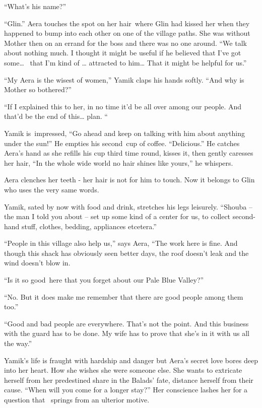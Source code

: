 \documentclass[12pt]{book}
\begin{document}
{}``What's his name?''

{}``Glin.'' Aera touches the spot on her hair~where Glin had kissed her when they happened to bump into each other on
one of the village paths. She was without Mother then on an errand for the boss and there was no one around. ``We talk
about nothing much. I thought it might be useful if he believed that I've got some{\dots} \ that I'm kind of {\dots}
attracted to him{\dots} That it might be helpful for us.''

{}``My Aera is the wisest of women,'' Yamik claps his hands softly. ``And why is Mother so bothered?''

{}``If I explained this to her, in no time it'd be all over among our people. And that'd be the end of this{\dots} plan.
``

Yamik is~impressed, ``Go ahead and keep on talking with him about anything under the sun!'' He empties his second~cup of
coffee. ``Delicious.'' He catches Aera's hand as she refills his cup third time round, kisses it, then gently caresses
her hair, ``In the whole wide world no hair shines like yours,'' he whispers.

Aera clenches her teeth - her hair is not for him to touch. Now it belongs to Glin who uses the very same words.~

Yamik, sated by now with food and drink, stretches his legs leisurely. ``Shouba -- the man I told you about -- set up
some kind of a center for us, to collect second-hand stuff, clothes, bedding, appliances etcetera.''

{}``People in this village also help us,'' says Aera, ``The work here is fine. And though this shack has obviously seen
better days, the roof doesn't leak and the wind doesn't blow in.{\textquotedbl}

{}``Is it so good~here that you forget about our Pale Blue Valley?''

{}``No. But it does make me remember that there are good people among them too.''

{}``Good and bad people are everywhere. That's not the point. And this business with the guard has to be done. My wife
has to prove that she's in it with us all the way.''

Yamik's life is fraught with hardship and danger but Aera's secret love bores deep into her heart. How she wishes she
were someone else. She wants to extricate herself from her predestined share in the Balads' fate, distance herself from
their cause. ``When will you come for a longer stay?'' Her conscience lashes her for a question that \ springs from an
ulterior motive.
\end{document}

